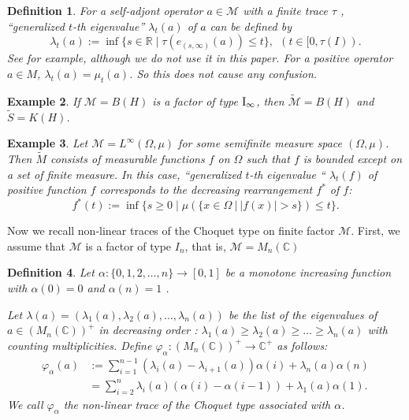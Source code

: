 \documentclass[a4paper,12pt]{amsart}
\newtheorem{definition}{Definition}[section]
\newtheorem{example}[definition]{Example}
\newcommand{\M}{\mathcal{M}}
\begin{document}
\begin{definition}
For a self-adjont operator $a \in \M$ with a finite trace $\tau$ ,  ``generalized $t$-th eigenvalue''
$\lambda_t(a)$ of $a$  can be  defined by 
$$
\lambda_t(a) := \inf \{s \in \mathbb R \; |\; \tau(e_{(s, \infty)}(a)) \leq t \} , \ \ (t \in [0, \tau(I)).
$$
See \cite{petz} for example, 
although we do not use it in this paper.  For a positive operator $a \in M$,  $\lambda_t(a) = \mu_t(a)$. So 
this does not cause any confusion. 
\end{definition}


\begin{example} \rm If $\M=B(H)$ is a factor of type ${\rm I}_{\infty}$, then $\tilde{\M} = B(H)$ and 
$\tilde{S} = K(H)$.  
\end{example}

\begin{example} \rm Let  $\M=L^{\infty}(\Omega,\mu)$ for some semifinite measure space $(\Omega,\mu)$. 
Then   $\tilde{M}$ consists of measurable functions $f$ on $\Omega$ such that $f$ is bounded except on a set of finite 
measure. In this case, ``generalized $t$-th eigenvalue ``
$\lambda_t(f)$ of positive function $f$ corresponds to the decreasing rearrangement $f^*$ of $f$:
$$
 f^*(t) := \inf \{s \geq 0 \; | \; \mu(\{x  \in \Omega \ | \ |f(x)| > s \}) \leq t \} . 
$$
\end{example}


Now we recall non-linear traces of the Choquet type on finite factor $\M$. 
First,  we assume that $\M$ is a factor of type $I_n$, that is, $\M = M_n({\mathbb C})$

\begin{definition} \rm
Let $\alpha: \{0,1,2, \dots, n\} \rightarrow [0, 1]$ be a 
monotone increasing function with $\alpha(0) = 0$ and $\alpha(n) = 1$ . 


Let 
$\lambda(a) = (\lambda_1(a),\lambda_2(a),\dots, \lambda_n(a))$ be the list of the 
eigenvalues of $a \in (M_n({\mathbb C}))^+ $ in decreasing order :
$\lambda_1(a) \geq \lambda_2(a) \geq \dots \geq \lambda_n(a)$ with 
counting multiplicities. 
Define 
$\varphi_{\alpha} : (M_n({\mathbb C}))^+ \rightarrow  {\mathbb C}^+$ 
as follows:
\begin{align*}
\varphi_{\alpha}(a) 
& :=  \sum_{i=1} ^{n-1} ( \lambda_i(a)- \lambda_{i+1}(a)) \alpha(i) 
+ \lambda_n (a) \alpha(n)\\
& = \sum_{i=2} ^{n}  \lambda_i(a)( \alpha(i) -  \alpha(i-1)) +  \lambda_1(a)\alpha(1).
\end{align*}
We call $\varphi_{\alpha}$ the non-linear trace of the Choquet type associated with $\alpha$.  
\end{definition}
\end{document}
